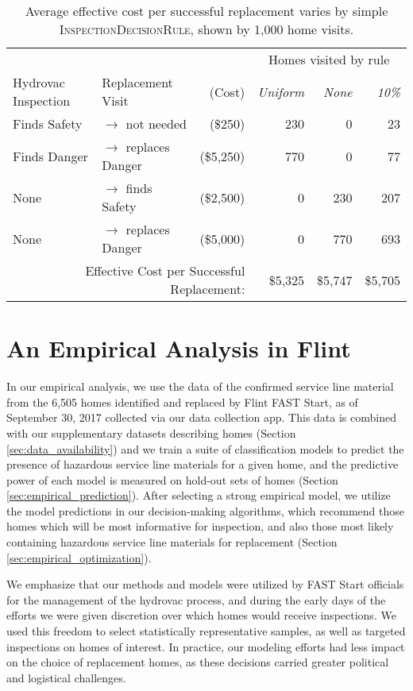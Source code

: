 \documentclass[sigconf]{acmart}
\def\druleHVI{\textsc{InspectionDecisionRule}\xspace}
\begin{document}
\begin{table}[!t]
\centering
\scriptsize{
  \begin{tabular}{llrrrr}
  \hline
   & & 					&  	\multicolumn{3}{c}{Homes visited by rule} \\
  Hydrovac Inspection & Replacement Visit & (Cost) & \emph{Uniform} & \emph{None} & \emph{10\%} \\
   \hline
  Finds Safety & $\to$ not needed  & (\$250) 		& 230 	 & 0 	 & 23 \\
  Finds Danger & $\to$ replaces Danger & (\$5,250) 	& 770 	 & 0 	 & 77 \\
  None & $\to$ finds Safety & (\$2,500) 				& 0 	 & 230 	 & 207 \\
  None & $\to$ replaces Danger & (\$5,000) 				& 0 	 & 770   & 693 \\
  \multicolumn{3}{r}{Effective Cost per Successful Replacement:} 		&\$5,325 &\$5,747&\$5,705 \\
  \hline
  \end{tabular}
  \caption{Average effective cost per successful replacement varies by simple \druleHVI, shown by 1,000 home visits.}\label{tbl:decision_rules}
}
\end{table}



\section{An Empirical Analysis in Flint}

\label{sec:empirical_flint}


In our empirical analysis, we use the data of the confirmed service line material from the 6,505 homes identified and replaced by Flint FAST Start, as of September 30, 2017 collected via our data collection app. This data is combined with our supplementary datasets describing homes (Section \ref{sec:data_availability}) and we train a suite of classification models to predict the presence of hazardous service line materials for a given home, and the predictive power of each model is measured on hold-out sets of homes (Section \ref{sec:empirical_prediction}). After selecting a strong empirical model, we utilize the model predictions in our decision-making algorithms, which recommend those homes which will be most informative for inspection, and also those most likely containing hazardous service line materials for replacement (Section \ref{sec:empirical_optimization}).

We emphasize that our methods and models were utilized by FAST Start officials for the management of the hydrovac process, and during the early days of the efforts we were given discretion over which homes would receive inspections. We used this freedom to select statistically representative samples, as well as targeted inspections on homes of interest. In practice, our modeling efforts had less impact on the choice of replacement homes, as these decisions carried greater political and logistical challenges.
\end{document}
